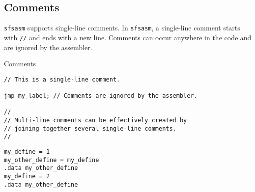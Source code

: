 \documentclass{article}
\begin{document}
\subsection{Comments}
{\tt sfsasm} supports single-line comments. In {\tt sfsasm}, a single-line comment starts with {\tt //} and ends with a new line. Comments can occur anywhere in the code and are ignored by the assembler.

\begin{codebox}{Comments}
\begin{verbatim}
// This is a single-line comment.

jmp my_label; // Comments are ignored by the assembler.

//
// Multi-line comments can be effectively created by
// joining together several single-line comments.
//
\end{verbatim}
\end{codebox}

\begin{verbatim}
my_define = 1
my_other_define = my_define
.data my_other_define
my_define = 2
.data my_other_define
\end{verbatim}
\end{document}
